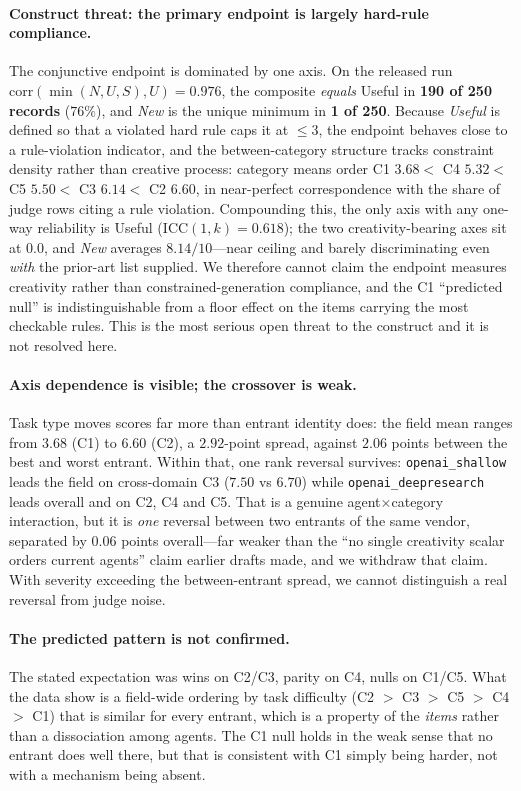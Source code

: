\paragraph{Construct threat: the primary endpoint is largely hard-rule compliance.} The conjunctive endpoint is dominated by one axis. On the released run $\mathrm{corr}(\min(N,U,S), U) = 0.976$, the composite \emph{equals} Useful in \textbf{190 of 250 records} ($76\%$), and \emph{New} is the unique minimum in \textbf{1 of 250}. Because \emph{Useful} is defined so that a violated hard rule caps it at ${\leq}3$, the endpoint behaves close to a rule-violation indicator, and the between-category structure tracks constraint density rather than creative process: category means order C1 $3.68 <$ C4 $5.32 <$ C5 $5.50 <$ C3 $6.14 <$ C2 $6.60$, in near-perfect correspondence with the share of judge rows citing a rule violation. Compounding this, the only axis with any one-way reliability is Useful ($\mathrm{ICC}(1,k)=0.618$); the two creativity-bearing axes sit at $0.0$, and \emph{New} averages $8.14/10$---near ceiling and barely discriminating even \emph{with} the prior-art list supplied. We therefore cannot claim the endpoint measures creativity rather than constrained-generation compliance, and the C1 ``predicted null'' is indistinguishable from a floor effect on the items carrying the most checkable rules. This is the most serious open threat to the construct and it is not resolved here.

\paragraph{Axis dependence is visible; the crossover is weak.} Task type moves scores far more than
entrant identity does: the field mean ranges from $3.68$ (C1) to $6.60$ (C2), a $2.92$-point spread,
against $2.06$ points between the best and worst entrant. Within that, one rank reversal survives:
\texttt{openai\_shallow} leads the field on cross-domain C3 ($7.50$ vs $6.70$) while
\texttt{openai\_deepresearch} leads overall and on C2, C4 and C5. That is a genuine
agent$\times$category interaction, but it is \emph{one} reversal between two entrants of the same
vendor, separated by $0.06$ points overall---far weaker than the ``no single creativity scalar
orders current agents'' claim earlier drafts made, and we withdraw that claim. With severity
exceeding the between-entrant spread, we cannot distinguish a real reversal from judge noise.

\paragraph{The predicted pattern is not confirmed.} The stated expectation was wins on C2/C3, parity
on C4, nulls on C1/C5. What the data show is a field-wide ordering by task difficulty
(C2 $>$ C3 $>$ C5 $>$ C4 $>$ C1) that is similar for every entrant, which is a property of the
\emph{items} rather than a dissociation among agents. The C1 null holds in the weak sense that no
entrant does well there, but that is consistent with C1 simply being harder, not with a mechanism
being absent.

